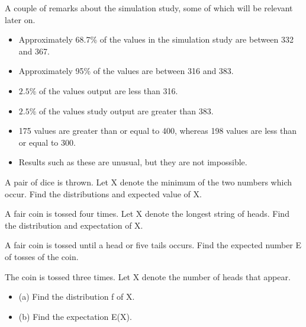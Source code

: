 \documentclass[12pt]{report}
\begin{document}
		
		
		
		A couple of remarks about the simulation study, some of which will be relevant later on.
		\begin{itemize}
			\item Approximately 68.7\% of the values in the simulation study are between 332 and 367.
			\item Approximately 95\% of the values are between 316 and 383.
			\item $2.5\%$ of the values output are less than 316.
			\item $2.5\%$ of the values study output are greater than 383.
			\item 175 values are greater than or equal to 400, whereas 198 values are less than or equal to 300.
			\item Results such as these are unusual, but they are not impossible.
		\end{itemize}
		
		
		
		A pair of dice is thrown. Let X denote the minimum of the two numbers which occur.
		Find the distributions and expected value of X.
		
		
		
		A fair coin is tossed four times.
		Let X denote the longest string of heads.
		Find the distribution and expectation of X.
		
		
		
		A fair coin is tossed until a head or five tails occurs.
		Find the expected number E of tosses of the coin.
		
		
		
		The coin is tossed three times. Let X denote the number of
		heads that appear.
		\begin{itemize}
			\item (a) Find the distribution f of X.
			\item (b) Find the expectation E(X).
		\end{itemize}
		
\end{document}
